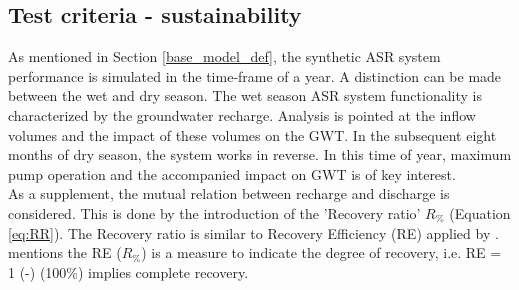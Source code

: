

\subsection{Test criteria - sustainability}
As mentioned in Section \ref{base_model_def}, the synthetic ASR system performance is simulated in the time-frame of a year. A distinction can be made between the wet and dry season. The wet season ASR system functionality is characterized by the groundwater recharge. Analysis is pointed at the inflow volumes and the impact of these volumes on the GWT. In the subsequent eight months of dry season, the system works in reverse. In this time of year, maximum pump operation and the accompanied impact on GWT is of key interest. \\
As a supplement, the mutual relation between recharge and discharge is considered. This is done by the introduction of the 'Recovery ratio' $R_{\%}$ (Equation \ref{eq:RR}). The Recovery ratio is similar to Recovery Efficiency (RE) applied by \citet{Ward2007}. \citet{Ward2007} mentions the RE ($R_{\%}$) is a measure to indicate the degree of recovery, i.e. RE = 1 (-) (100\%) implies complete recovery. 

